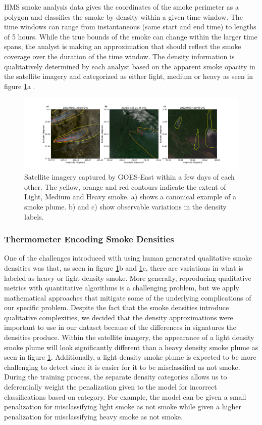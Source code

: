 \documentclass{article}
\begin{document}
HMS smoke analysis data gives the coordinates of the smoke perimeter as a polygon and classifies the smoke by density within a given time window. The time windows can range from instantaneous (same start and end time) to lengths of 5 hours. While the true bounds of the smoke can change within the larger time spans, the analyst is making an approximation that should reflect the smoke coverage over the duration of the time window. The density information is qualitatively determined by each analyst based on the apparent smoke opacity in the satellite imagery and categorized as either light, medium or heavy as seen in figure \ref{densities}a \cite{hms_web}.

\begin{figure}
    \centering
    \includegraphics[width=14cm]{figures/Misclassified.png}
    \caption{Satellite imagery captured by GOES-East within a few days of each other. The yellow, orange and red contours indicate the extent of Light, Medium and Heavy smoke.  a) shows a canonical example of a smoke plume. b) and c) show observable variations in the density labels.}\label{densities}
\end{figure}

\subsubsection*{Thermometer Encoding Smoke Densities}

One of the challenges introduced with using human generated qualitative smoke densities was that, as seen in figure \ref{densities}b and \ref{densities}c, there are variations in what is labeled as heavy or light density smoke. More generally, reproducing qualitative metrics with quantitative algorithms is a challenging problem, but we apply mathematical approaches that mitigate some of the underlying complications of our specific problem. Despite the fact that the smoke densities introduce qualitative complexities, we decided that the density approximations were important to use in our dataset because of the differences in signatures the densities produce. Within the satellite imagery, the appearance of a light density smoke plume will look significantly different than a heavy density smoke plume as seen in figure \ref{densities}. Additionally, a light density smoke plume is expected to be more challenging to detect since it is easier for it to be misclassified as not smoke. During the training process, the separate density categories allows us to deferentially weight the penalization given to the model for incorrect classifications based on category. For example, the model can be given a small penalization for misclassifying light smoke as not smoke while given a higher penalization for misclassifying heavy smoke as not smoke. 
\end{document}

